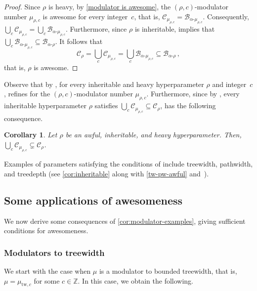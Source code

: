 \documentclass[11pt]{article}
\newcommand{\tw}{\mathrm{tw}}
\newcommand{\rhocm}{\mu_{\rho,c}}
\newcommand{\twcm}{\mu_{\tw,c}}
\theoremstyle{plain}
\newtheorem{corollary}[theorem]{Corollary}
\theoremstyle{definition}
\theoremstyle{remark}
\numberwithin{equation}{section}
\begin{document}
\begin{proof}
Since $\rho$ is heavy, by \cref{modulator is awesome}, the $(\rho,c)$-modulator number $\rhocm$ is awesome for every integer~$c$, that is, $\mathcal{C}_{\rhocm} = \mathcal{B}_{\alpha\text{-}\rhocm}$.
Consequently, $\bigcup_c\mathcal{C}_{\rhocm} = \bigcup_c\mathcal{B}_{\alpha\text{-}\rhocm}$.
Furthermore, since $\rho$ is inheritable,  implies that $\bigcup_c\mathcal{B}_{\alpha\text{-}\rhocm} \subseteq \mathcal{B}_{\alpha\text{-}\rho}$.
It follows that 
\[\mathcal{C}_{\rho} = \bigcup_{c}\mathcal{C}_{\rhocm}
= \bigcup_c\mathcal{B}_{\alpha\text{-}\rhocm} \subseteq \mathcal{B}_{\alpha\text{-}\rho}\,,\]
that is, $\rho$ is awesome.
\end{proof}

Observe that by , for every inheritable and heavy hyperparameter $\rho$ and integer~$c$,   refines  for the  $(\rho,c)$-modulator number $\rhocm$.
Furthermore, since by , every inheritable hyperparameter $\rho$ satisfies $\bigcup_{c}\mathcal{C}_{\rhocm}\subseteq \mathcal{C}_{\rho}$,  has the following consequence.

\begin{corollary}\label{cor:clique-bounded-strict}
Let $\rho$ be an awful, inheritable, and heavy hyperparameter.
Then, $\bigcup_{c}\mathcal{C}_{\rhocm}\subsetneq \mathcal{C}_{\rho}$.
\end{corollary}

Examples of parameters satisfying the conditions of  include treewidth, pathwidth, and treedepth (see \cref{cor:inheritable} along with \cref{tw-pw-awful} and~\cite{CT24}).

\subsection{Some applications of awesomeness}\label{sec:applications}

We now derive some consequences of \cref{cor:modulator-examples}, giving sufficient conditions for awesomeness. 

\subsubsection{Modulators to treewidth}

We start with the case when $\mu$ is a modulator to bounded treewidth, that is, $\mu=\twcm$ for some $c\in \mathbb{Z}$.
In this case, we obtain the following.
\end{document}
